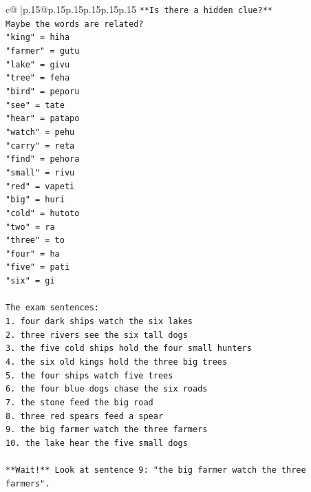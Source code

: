 \documentclass{article}
\begin{document}
{\begin{supertabular}{c@{$\;$}|p{.15\linewidth}@{}p{.15\linewidth}p{.15\linewidth}p{.15\linewidth}p{.15\linewidth}p{.15\linewidth}}
{{{\texttt{**Is there a hidden clue?**} \\
\texttt{Maybe the words are related?} \\
\texttt{"king" = hiha} \\
\texttt{"farmer" = gutu} \\
\texttt{"lake" = givu} \\
\texttt{"tree" = feha} \\
\texttt{"bird" = peporu} \\
\texttt{"see" = tate} \\
\texttt{"hear" = patapo} \\
\texttt{"watch" = pehu} \\
\texttt{"carry" = reta} \\
\texttt{"find" = pehora} \\
\texttt{"small" = rivu} \\
\texttt{"red" = vapeti} \\
\texttt{"big" = huri} \\
\texttt{"cold" = hutoto} \\
\texttt{"two" = ra} \\
\texttt{"three" = to} \\
\texttt{"four" = ha} \\
\texttt{"five" = pati} \\
\texttt{"six" = gi} \\
\\ 
\texttt{The exam sentences:} \\
\texttt{1. four dark ships watch the six lakes} \\
\texttt{2. three rivers see the six tall dogs} \\
\texttt{3. the five cold ships hold the four small hunters} \\
\texttt{4. the six old kings hold the three big trees} \\
\texttt{5. the four ships watch five trees} \\
\texttt{6. the four blue dogs chase the six roads} \\
\texttt{7. the stone feed the big road} \\
\texttt{8. three red spears feed a spear} \\
\texttt{9. the big farmer watch the three farmers} \\
\texttt{10. the lake hear the five small dogs} \\
\\ 
\texttt{**Wait!** Look at sentence 9: "the big farmer watch the three farmers".} \\
}}}
\end{supertabular}}
\end{document}
